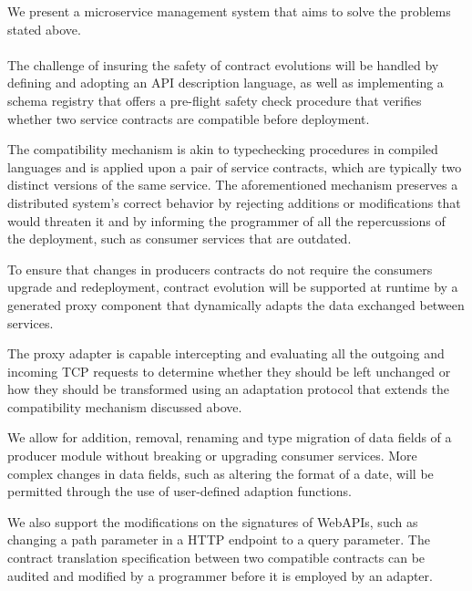 We present a microservice management system that aims to solve the problems stated above.

\paragraph{}

The challenge of insuring the safety of contract evolutions will be handled by defining and adopting an API description language, as well as implementing a schema
registry that offers a pre-flight safety check procedure that verifies whether two service contracts are compatible before
deployment.

The compatibility mechanism is akin to typechecking procedures in compiled languages and is applied upon a
pair of service contracts, which are typically two distinct versions of the same service. The aforementioned mechanism preserves
a distributed system's correct behavior by rejecting additions or modifications that would threaten it and by informing the programmer
of all the repercussions of the deployment, such as consumer services that are outdated.

To ensure that changes in producers contracts do not require the consumers upgrade and redeployment, contract evolution
will be supported at runtime by a generated proxy component that dynamically adapts the data exchanged between services.

The proxy adapter is capable intercepting and evaluating all the outgoing and incoming TCP requests to determine whether
they should be left unchanged or how they should be transformed using an adaptation protocol that extends the compatibility mechanism discussed above.

We allow for addition, removal, renaming and type migration of data fields of a producer module without breaking or upgrading consumer services.
More complex changes in data fields, such as altering the format of a date, will be permitted through the use of user-defined adaption functions.

We also support the modifications on the signatures of WebAPIs, such as changing a path parameter in a HTTP endpoint to a query parameter.
The contract translation specification between two compatible contracts can be audited and modified by a programmer before it is employed by an adapter.

\paragraph{}

